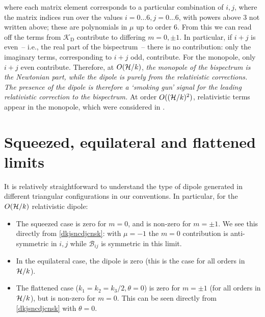 where each matrix element corresponds to a particular combination of $i,j$,
where the matrix indices run over the values $i=0\ldots6, j=0\ldots6$, with powers above 3 not written above; these are polynomials in $\mu$ up to order 6. From this we can read off the terms from $\mathcal{K}_\text{D}$ contribute to differing $m=0,\pm1$. In particular, if $i+j$ is even~-- i.e., the real part of the bispectrum~--  there is no contribution: only the imaginary terms, corresponding to $i+j$ odd, contribute. For the monopole, only $i+j$ even contribute. Therefore, at $O(\mathcal{H}/k)$, \emph{the monopole of the bispectrum is the Newtonian part, while the dipole is purely from the relativistic corrections.  The presence of the dipole is therefore a `smoking gun' signal for the leading relativistic correction to the bispectrum.} At order $O((\mathcal{H}/k)^{2})$, relativistic terms appear in the monopole, which were considered in \citet{Umeh:2016nuh,Jolicoeur:2017nyt,Jolicoeur:2017eyi,Jolicoeur:2018blf}.\\


\section{Squeezed, equilateral and flattened limits}

It is relatively straightforward to understand the type of dipole generated in different triangular configurations in our conventions. In particular, for the $O(\mathcal{H}/k)$ relativistic dipole:
\begin{itemize}
\item The squeezed case is zero for $m=0$, and is non-zero for $m=\pm1$. We see this directly from \eqref{dkjsncdjcnsk}: with $\mu=-1$ the $m=0$ contribution is anti-symmetric in $i,j$ while $\mathcal{B}_{ij}$ is symmetric in this limit.
\item In the equilateral case, the dipole is zero (this is the case for all orders in $\mathcal{H}/k$).
\item The flattened case ($k_1=k_2=k_3/2,\theta=0$) is zero for $m=\pm1$ (for all orders in $\mathcal{H}/k$), but is non-zero for $m=0$. This can be seen directly from \eqref{dkjsncdjcnsk} with $\theta=0$.
\end{itemize}
 
